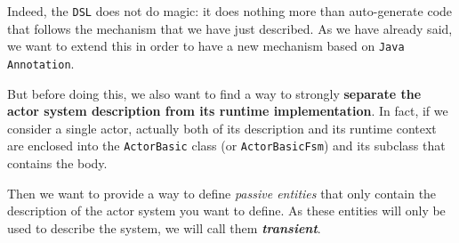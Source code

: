 Indeed, the \texttt{DSL} does not do magic: it does nothing more than auto-generate code that follows the mechanism that we have just described.
As we have already said, we want to extend this in order to have a new mechanism based on \texttt{Java Annotation}.

But before doing this, we also want to find a way to strongly \textbf{separate the actor system description from its runtime implementation}. In fact, if we consider a single actor, actually both of its description and its runtime context are enclosed into the \texttt{ActorBasic} class (or \texttt{ActorBasicFsm}) and its subclass that contains the body.

Then we want to provide a way to define \textit{passive entities} that only contain the description of the actor system you want to define. As these entities will only be used to describe the system, we will call them \textbf{\textit{transient}}. 

